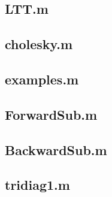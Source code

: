 \documentclass[12pt]{article}
\begin{document}
\subsection{LTT.m}


\subsection{cholesky.m}


\subsection{examples.m}


\subsection{ForwardSub.m}


\subsection{BackwardSub.m}


\subsection{tridiag1.m}


\end{document}
